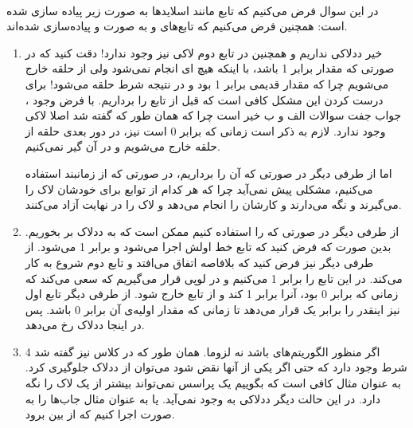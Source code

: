 \\\noindent
در این سوال فرض می‌کنیم که تابع
مانند اسلاید‌ها به صورت زیر پیاده سازی شده است:
همچنین فرض می‌کنیم که تابع‌های
و
به صورت
و
پیاده‌سازی شده‌اند.
\begin{enumerate}
    \item خیر ددلاکی نداریم و همچنین در تابع دوم لاکی نیز وجود ندارد!
    دقت کنید که در صورتی که مقدار
    برابر 1 باشد، با اینکه هیچ
    ای
    انجام نمی‌شود ولی از حلقه خارج می‌شویم چرا که مقدار قدیمی
    برابر 1 بود و در نتیجه شرط حلقه
    می‌شود! برای درست کردن این مشکل کافی است که
    \codeword{!}
    قبل از تابع را برداریم.
    با فرض وجود
    ،
    جواب جفت سوالات الف و ب خیر است چرا که همان طور که گفته شد اصلا لاکی وجود ندارد.
    لازم به ذکر است زمانی که
    برابر 0 است نیز، در دور بعدی حلقه از حلقه خارج می‌شویم و در آن گیر نمی‌کنیم.

    \noindent
    اما از طرفی دیگر در صورتی که آن
    \codeword{!}
    را برداریم، در صورتی که از زمانبند
    استفاده می‌کنیم، مشکلی پیش نمی‌آید چرا که هر کدام از توابع برای خودشان لاک را می‌گیرند و نگه می‌دارند
    و کارشان را انجام می‌دهد و لاک را در نهایت آزاد می‌کنند.
    \item از طرفی دیگر در صورتی که
    را استفاده کنیم ممکن است که به ددلاک بر بخوریم. بدین صورت که فرض کنید که تابع
    خط اولش اجرا می‌شود و
    برابر 1 می‌شود. از طرفی دیگر نیز فرض کنید که بلافاصه
    اتفاق می‌افتد و تابع دوم شروع به کار می‌کند. در این تابع
    را برابر 1 می‌کنیم و در لوپی قرار می‌گیریم که سعی می‌کند که زمانی که
    برابر 0 بود، آنرا برابر 1 کند و از تابع خارج شود.
    از طرفی دیگر تابع اول نیز اینقدر
    را برابر یک قرار می‌دهد تا زمانی که مقدار اولیه‌ی آن برابر 0 باشد. پس در اینجا ددلاک رخ می‌دهد.
    \item اگر منظور الگوریتم‌های  باشد
     نه لزوما. همان طور که در کلاس نیز گفته شد 4 شرط وجود دارد که حتی اگر یکی از آنها نقض شود می‌توان
    از ددلاک جلوگیری کرد. به عنوان مثال کافی است که بگوییم یک پراسس نمی‌تواند بیشتر از یک لاک را نگه دارد.
    در این حالت دیگر ددلاکی به وجود نمی‌آید. یا به عنوان مثال جاب‌ها را به صورت
    اجرا کنیم که
    از بین برود.


\end{enumerate}
